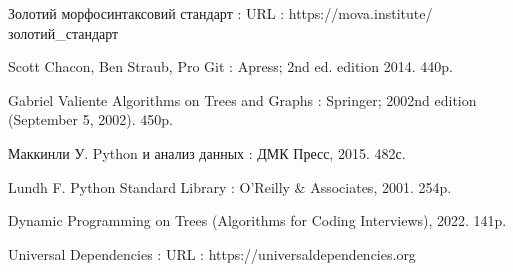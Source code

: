 \begin{thebibliography}{99}
Золотий морфосинтаксовий стандарт : URL :
https://mova.institute/золотий\_стандарт



Scott Chacon, Ben Straub, Pro Git : Apress; 2nd ed. edition 2014. 440p.

Gabriel Valiente Algorithms on Trees and Graphs : Springer; 2002nd edition (September 5, 2002). 450p.

Маккинли У. Python и анализ данных : ДМК Пресс, 2015. 482с.

Lundh F. Python Standard Library : O’Reilly \& Associates, 2001. 254p.

Dynamic Programming on Trees (Algorithms for Coding Interviews), 2022. 141p.

Universal Dependencies : URL : https://universaldependencies.org

\end{thebibliography}